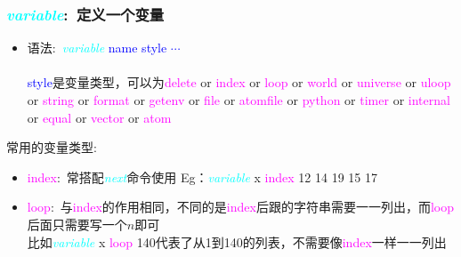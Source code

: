 \frame
{
	\frametitle{\textcolor{cyan}{\textit{variable}}:~定义一个变量}
	\begin{itemize}
		\item 语法:~\textcolor{cyan}{\textit{variable}} \textrm{\textcolor{blue}{name style $\cdots$}}\\
			{\fontsize{7.5pt}{5.2pt}}\\
			\textrm{\textcolor{blue}{style}}是变量类型，可以为\textrm{\textcolor{magenta}{delete} or \textcolor{magenta}{index} or \textcolor{magenta}{loop} or \textcolor{magenta}{world} or \textcolor{magenta}{universe} or \textcolor{magenta}{uloop} or \textcolor{magenta}{string} or \textcolor{magenta}{format} or \textcolor{magenta}{getenv} or \textcolor{magenta}{file} or \textcolor{magenta}{atomfile} or \textcolor{magenta}{python} or \textcolor{magenta}{timer} or \textcolor{magenta}{internal} or \textcolor{magenta}{equal} or \textcolor{magenta}{vector} or \textcolor{magenta}{atom}}
			\vskip 3pt
{\fontsize{6.2pt}{5.2pt}}
	\end{itemize}
	常用的变量类型:
	\begin{itemize}
		\item \textrm{\textcolor{magenta}{index}}:~常搭配\textcolor{cyan}{\textit{next}}命令使用%
			Eg：\textcolor{cyan}{\textit{variable}} \textrm{x} \textrm{\textcolor{magenta}{index}} \textrm{12 14 19 15 17}
\item \textrm{\textcolor{magenta}{loop}}:~与\textrm{\textcolor{magenta}{index}}的作用相同，不同的是\textrm{\textcolor{magenta}{index}}后跟的字符串需要一一列出，而\textrm{\textcolor{magenta}{loop}}后面只需要写一个$n$即可\\
	比如\textcolor{cyan}{\textit{variable}} \textrm{x} \textrm{\textcolor{magenta}{loop}} \textrm{140}代表了从1到140的列表，不需要像\textrm{\textcolor{magenta}{index}}一样一一列出
	\end{itemize}
}

